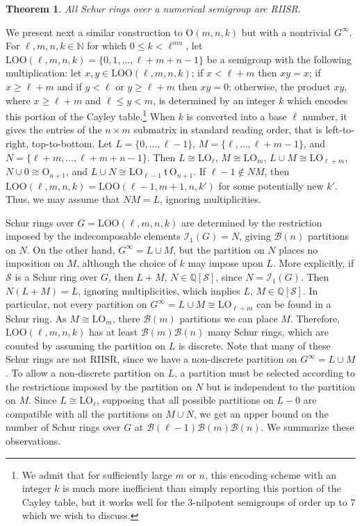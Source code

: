 \documentclass{article}
\theoremstyle{plain}
\newtheorem{Thm}{Theorem}[section]
\theoremstyle{definition}
\renewcommand{\S}{\mathcal{S}}
\newcommand{\Q}{\mathbb{Q}}
\newcommand{\N}{\mathbb{N}}
\newcommand{\QS}{\Q[\S]}
\newcommand{\I}{\mathscr{I}}
\newcommand{\B}{\mathscr{B}}
\renewcommand{\O}{\mathrm{O}}
\newcommand{\LO}{\mathrm{LO}}
\newcommand{\LOO}{\mathrm{LOO}}
\renewcommand{\t}{\ \mathfrak{t}\ }
\begin{document}
\begin{Thm} All Schur rings over a numerical semigroup are RIISR.
\end{Thm}

We present next a similar construction to $\O(m,n,k)$ but with a nontrivial $G^\infty$. For $\ell, m,n,k\in \N$ for which $0\le k<\ell^{nm}$, let \label{loo}$\LOO(\ell, m,n,k) = \{0,1,\ldots, \ell+m+n-1\}$ be a semigroup with the following multiplication: let $x,y\in \LOO(\ell, m,n,k)$; if $x<\ell+m$ then $xy=x$; if $x\ge \ell + m$ and if $y<\ell$ or $y\ge \ell + m$ then $xy=0$; otherwise, the product $xy$, where $x\ge \ell +m$ and $\ell \le y <m$, is determined by an integer $k$ which encodes this portion of the Cayley table.\footnote{We admit that for sufficiently large $m$ or $n$, this encoding scheme with an integer $k$ is much more inefficient than simply reporting this portion of the Cayley table, but it works well for the $3$-nilpotent semigroups of order up to $7$ which we wish to discuss.} When $k$ is converted into a base $\ell$ number, it gives the entries of the $n\times m$ submatrix in standard reading order, that is left-to-right, top-to-bottom. Let $L=\{0,\ldots, \ell-1\}$, $M=\{\ell, \ldots, \ell+m-1\}$, and $N=\{\ell+m,\ldots, \ell+m+n-1\}$. Then $L\cong \LO_\ell$, $M\cong \LO_m$, $L\cup M\cong \LO_{\ell+m}$, $N\cup 0 \cong \O_{n+1}$, and $L\cup N\cong \LO_{\ell-1}\t \O_{n+1}$. If $\ell-1\notin NM$, then $\LOO(\ell,m,n,k) = \LOO(\ell-1,m+1,n,k')$ for some potentially new $k'$. Thus, we may assume that $NM=L$, ignoring multiplicities.

Schur rings over $G=\LOO(\ell,m,n,k)$ are determined by the restriction imposed by the indecomposable elements $\I_1(G)=N$, giving $\B(n)$ partitions on $N$. On the other hand, $G^\infty=L\cup M$, but the partition on $N$ places no imposition on $M$, although the choice of $k$ may impose upon $L$. More explicitly, if $\S$ is a Schur ring over $G$, then $L+M$, $N\in \QS$, since $N=\I_1(G)$.  Then $N(L+M) = L$, ignoring multiplicities, which implies $L$, $M\in \QS$. In particular, not every partition on $G^\infty = L\cup M \cong \LO_{\ell+m}$ can be found in a Schur ring. As $M\cong \LO_m$, there $\B(m)$ partitions we can place $M$. Therefore, $\LOO(\ell,m,n,k)$ has at least $\B(m)\B(n)$ many Schur rings, which are counted by assuming the partition on $L$ is discrete. Note that many of these Schur rings are not RIISR, since we have a non-discrete partition on $G^\infty = L\cup M$. To allow a non-discrete partition on $L$, a partition must be selected according to the restrictions imposed by the partition on $N$ but is independent to the partition on $M$. Since $L\cong \LO_\ell$, supposing that all possible partitions on $L-0$ are compatible with all the partitions on $M\cup N$, we get an upper bound on the number of Schur rings over $G$ at $\B(\ell-1)\B(m)\B(n)$. We summarize these observations.
\end{document}
